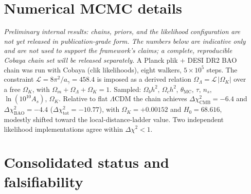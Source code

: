 \documentclass[11pt,a4paper]{article}
\theoremstyle{plain}
\theoremstyle{definition}
\theoremstyle{remark}
\newcommand{\Ok}{\Omega_K}
\newcommand{\OL}{\Omega_\Lambda}
\newcommand{\Om}{\Omega_m}
\newcommand{\ag}{a_\gamma}
\newcommand{\Lb}{\mathcal{L}}
\begin{document}
\section{Numerical MCMC details}
\label{sec:mcmc}
\emph{Preliminary internal results: chains, priors, and the likelihood configuration are not yet
released in publication-grade form. The numbers below are indicative only and are not used to
support the framework's claims; a complete, reproducible Cobaya chain set will be released
separately.} A Planck plik $+$ DESI DR2 BAO chain was run with Cobaya
(clik likelihoods), eight walkers, $5\times10^5$ steps. The constraint
$\Lb = 8\pi^2/\ag = 458.4$ is imposed as a derived relation $\OL = \Lb\,|\Ok|$ over a free $\Ok$,
with $\Om + \OL + \Ok = 1$. Sampled: $\Omega_b h^2$, $\Omega_c h^2$, $\theta_{\mathrm{MC}}$,
$\tau$, $n_s$, $\ln(10^{10}A_s)$, $\Ok$. Relative to flat $\Lambda$CDM the chain achieves
$\Delta\chi^2_{\mathrm{CMB}} = -6.4$ and $\Delta\chi^2_{\mathrm{BAO}} = -4.4$
($\Delta\chi^2_{\mathrm{tot}} = -10.77$), with $\Ok = +0.00152$ and $H_0 = 68.616$, modestly
shifted toward the local-distance-ladder value. Two independent likelihood implementations agree
within $\Delta\chi^2 < 1$.

\section{Consolidated status and falsifiability}
\label{sec:status}
\end{document}
